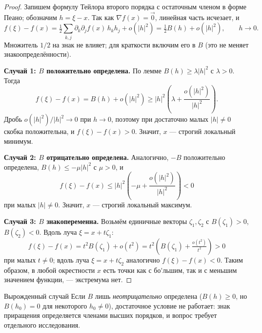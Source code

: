 \begin{proof}
	Запишем формулу Тейлора второго порядка с остаточным членом в форме Пеано;
	обозначим $h=\xi-x$. Так как $\nabla f(x)=\vec 0$, линейная часть исчезает, и
	\[
	f(\xi)-f(x)=\tfrac12\sum_{k,j}\partial_k\partial_j f(x)\,h_k h_j+o(|h|^2)
	=\tfrac12 B(h)+o(|h|^2),\qquad h\to 0.
	\]
	Множитель $1/2$ на знак не влияет; для краткости включим его в $B$ (это не меняет
	знакоопределённости).

	\textbf{Случай 1: $B$ положительно определена.} По лемме $B(h)\ge\lambda|h|^2$ с
	$\lambda>0$. Тогда
	\[
	f(\xi)-f(x)=B(h)+o(|h|^2)\ge|h|^2\!\left(\lambda+\frac{o(|h|^2)}{|h|^2}\right).
	\]
	Дробь $o(|h|^2)/|h|^2\to 0$ при $h\to 0$, поэтому при достаточно малых $|h|\ne 0$
	скобка положительна, и $f(\xi)-f(x)>0$. Значит, $x$ --- строгий локальный минимум.

	\textbf{Случай 2: $B$ отрицательно определена.} Аналогично, $-B$ положительно
	определена, $B(h)\le-\mu|h|^2$ с $\mu>0$, и
	\[
	f(\xi)-f(x)\le|h|^2\!\left(-\mu+\frac{o(|h|^2)}{|h|^2}\right)<0
	\]
	при малых $|h|\ne 0$. Значит, $x$ --- строгий локальный максимум.

	\textbf{Случай 3: $B$ знакопеременна.} Возьмём единичные векторы $\zeta_1,\zeta_2$
	с $B(\zeta_1)>0$, $B(\zeta_2)<0$. Вдоль луча $\xi=x+t\zeta_1$:
	\[
	f(\xi)-f(x)=t^2 B(\zeta_1)+o(t^2)=t^2\!\left(B(\zeta_1)+\tfrac{o(t^2)}{t^2}\right)>0
	\]
	при малых $t\ne 0$; вдоль луча $\xi=x+t\zeta_2$ аналогично $f(\xi)-f(x)<0$.
	Таким образом, в любой окрестности $x$ есть точки как с бо\'{}льшим, так и с
	меньшим значением функции, --- экстремума нет.
\end{proof}

\begin{Remark}{Вырожденный случай}{}
	Если $B$ лишь \emph{неотрицательно} определена ($B(h)\ge 0$, но $B(h_0)=0$ для
	некоторого $h_0\ne 0$), достаточное условие не работает: знак приращения
	определяется членами высших порядков, и вопрос требует отдельного исследования.
\end{Remark}
